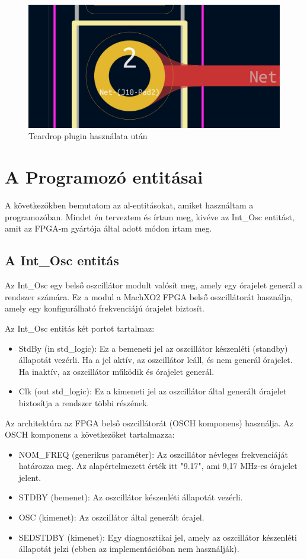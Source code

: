 \documentclass[a4paper,12pt,oneside]{book}
\begin{document}
\begin{figure}[H]
	\centering
	\includegraphics[trim=1mm 1mm 1mm 1mm,scale=0.4]{viaafter.PNG}
	\caption{Teardrop plugin használata után}
	\label{Teardrop plugin használata után} 
\end{figure}


\section{A Programozó entitásai}
A következőkben bemutatom az al-entitásokat, amiket használtam a programozóban. Mindet én terveztem és írtam meg, kivéve az Int\_Osc entitást, amit az FPGA-m gyártója által adott módon írtam meg.
\subsection{A Int\_Osc entitás}
Az Int\_Osc egy belső oszcillátor modult valósít meg, amely egy órajelet generál a rendszer számára. Ez a modul a MachXO2 FPGA belső oszcillátorát használja, amely egy konfigurálható frekvenciájú órajelet biztosít. 


Az Int\_Osc entitás két portot tartalmaz:
\begin{itemize}
	\item StdBy (in std\_logic): Ez a bemeneti jel az oszcillátor készenléti (standby) állapotát vezérli. Ha a jel aktív, az oszcillátor leáll, és nem generál órajelet. Ha inaktív, az oszcillátor működik és órajelet generál.
	\item Clk (out std\_logic): Ez a kimeneti jel az oszcillátor által generált órajelet biztosítja a rendszer többi részének.
\end{itemize}

Az architektúra az FPGA belső oszcillátorát (OSCH komponens) használja. Az OSCH komponens a következőket tartalmazza:

\begin{itemize}
	\item NOM\_FREQ (generikus paraméter): Az oszcillátor névleges frekvenciáját határozza meg. Az alapértelmezett érték itt "9.17", ami 9,17 MHz-es órajelet jelent.
	\item STDBY (bemenet): Az oszcillátor készenléti állapotát vezérli.
	\item OSC (kimenet): Az oszcillátor által generált órajel.
	\item SEDSTDBY (kimenet): Egy diagnosztikai jel, amely az oszcillátor készenléti állapotát jelzi (ebben az implementációban nem használják).
\end{itemize}
\end{document}
